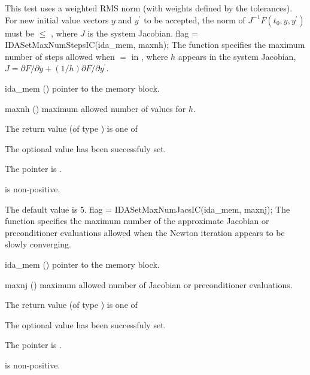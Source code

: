 {{  This test uses a weighted RMS norm (with weights defined by the tolerances).
  For new initial value vectors $y$ and $y^\prime$ to be accepted, the norm
  of $J^{-1}F(t_0, y, y^\prime)$ must be $\le$ , where $J$ is the
  system Jacobian.
}
{
flag = IDASetMaxNumStepsIC(ida\_mem, maxnh);
}
{
  The function  specifies the maximum number
  of steps allowed when $=$
  in , where $h$ appears in the system Jacobian,
  $J = \partial F / \partial y + (1/h) \partial F / \partial y^\prime$.
}
{
  \begin{args}
  \item[ida\_mem] ()
    pointer to the {\ida} memory block.
  \item[maxnh] ()
    maximum allowed number of values for $h$.
  \end{args}
}
{
  The return value  (of type ) is one of
  \begin{args}
  \item[\Id{IDA\_SUCCESS}] 
    The optional value has been successfuly set.
  \item[\Id{IDA\_MEM\_NULL}]
    The  pointer is .
  \item[\Id{IDA\_ILL\_INPUT}]
     is non-positive.
  \end{args}
}
{
  The default value is $5$.
}
{
flag = IDASetMaxNumJacsIC(ida\_mem, maxnj);
}
{
  The function  specifies the maximum number
  of the approximate Jacobian or preconditioner evaluations allowed 
  when the Newton iteration appears to be slowly converging.
}
{
  \begin{args}
  \item[ida\_mem] ()
    pointer to the {\ida} memory block.
  \item[maxnj] ()
    maximum allowed number of Jacobian or preconditioner evaluations.
  \end{args}
}
{
  The return value  (of type ) is one of
  \begin{args}
  \item[\Id{IDA\_SUCCESS}] 
    The optional value has been successfuly set.
  \item[\Id{IDA\_MEM\_NULL}]
    The  pointer is .
  \item[\Id{IDA\_ILL\_INPUT}]
     is non-positive.

\end{args}}}
